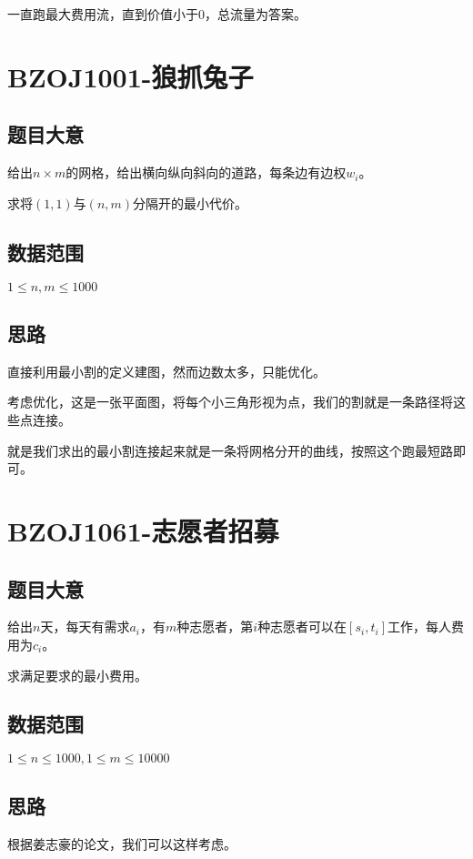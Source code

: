 \documentclass{ctexart}
\numberwithin{equation}{section}
\begin{document}
\begin{flushleft}
  一直跑最大费用流，直到价值小于$0$，总流量为答案。
  \newpage

  \section{BZOJ1001-狼抓兔子}
  \subsection{题目大意}
  给出$n\times m$的网格，给出横向纵向斜向的道路，每条边有边权$w_i$。

  求将$(1,1)$与$(n,m)$分隔开的最小代价。
  
    
  \subsection{数据范围}
  $1\le n,m \le 1000$
  \subsection{思路}
  直接利用最小割的定义建图，然而边数太多，只能优化。

  考虑优化，这是一张平面图，将每个小三角形视为点，我们的割就是一条路径将这些点连接。

  就是我们求出的最小割连接起来就是一条将网格分开的曲线，按照这个跑最短路即可。
  \newpage

  \section{BZOJ1061-志愿者招募}
  \subsection{题目大意}
  给出$n$天，每天有需求$a_i$，有$m$种志愿者，第$i$种志愿者可以在$[s_i,t_i]$工作，每人费用为$c_i$。

  求满足要求的最小费用。
  
    
  \subsection{数据范围}
  $1\le n \le 1000,1\le m\le 10000$
  \subsection{思路}
  根据姜志豪的论文，我们可以这样考虑。


\end{flushleft}
\end{document}
